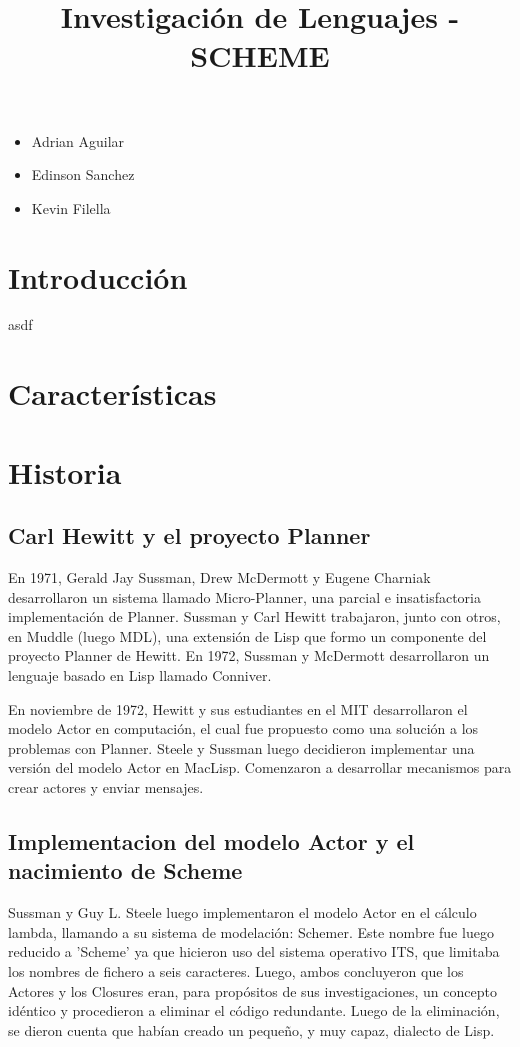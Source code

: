 \documentclass[11pt]{article} %
\title{Investigación de Lenguajes - SCHEME}
\begin{document}
\maketitle
\begin{itemize}
\item Adrian Aguilar
\item Edinson Sanchez
\item Kevin Filella
\end{itemize}

\section{Introducción}
asdf

\section{Características}
\section{Historia}
\subsection{Carl Hewitt y el proyecto Planner}

En 1971, Gerald Jay Sussman, Drew McDermott y Eugene Charniak desarrollaron un sistema llamado Micro-Planner, una parcial e insatisfactoria implementación de Planner. Sussman y Carl Hewitt trabajaron, junto con otros, en Muddle (luego MDL), una extensión de Lisp que formo un componente del proyecto Planner de Hewitt. En 1972, Sussman y McDermott desarrollaron un lenguaje basado en Lisp llamado Conniver.

En noviembre de 1972, Hewitt y sus estudiantes en el MIT desarrollaron el modelo Actor en computación, el cual fue propuesto como una solución a los problemas con Planner. Steele y Sussman luego decidieron implementar una versión del modelo Actor en MacLisp. Comenzaron a desarrollar mecanismos para crear actores y enviar mensajes.

\subsection{Implementacion del modelo Actor y el nacimiento de Scheme}

Sussman y Guy L. Steele luego implementaron el modelo Actor en el cálculo lambda, llamando a su sistema de modelación: Schemer. Este nombre fue luego reducido a 'Scheme' ya que hicieron uso del sistema operativo ITS, que limitaba los nombres de fichero a seis caracteres. Luego, ambos concluyeron que los Actores y los Closures eran, para propósitos de sus investigaciones, un concepto idéntico y procedieron a eliminar el código redundante. Luego de la eliminación, se dieron cuenta que habían creado un pequeño, y muy capaz, dialecto de Lisp.
\end{document}
